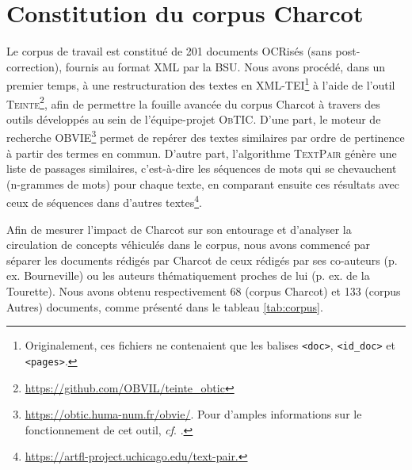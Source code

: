 \section{Constitution du corpus Charcot}
Le corpus de travail est constitué de 201 documents OCRisés (sans post-correction), fournis au format \textsc{XML} par la \textsc{BSU}. Nous avons procédé, dans un premier temps, à une restructuration des textes en \textsc{XML-TEI}\footnote{Originalement, ces fichiers ne contenaient que les balises \texttt{<doc>}, \texttt{<id\_doc>} et \texttt{<pages>}.} à l'aide de l'outil \textsc{Teinte}\footnote{\url{https://github.com/OBVIL/teinte\_obtic}}, afin de permettre la fouille avancée du corpus Charcot à travers des outils développés au sein de l'équipe-projet \textsc{ObTIC}. D'une part, le moteur de recherche \textsc{OBVIE}\footnote{\url{https://obtic.huma-num.fr/obvie/}. Pour d'amples informations sur le fonctionnement de cet outil, \textit{cf}. \citet{alrahabi2022obvie}.} permet de repérer des textes similaires par ordre de pertinence à partir des termes en commun. D'autre part, l'algorithme \textsc{TextPair} génère une liste de passages similaires, c'est-à-dire les séquences de mots qui se chevauchent (n-grammes de mots) pour chaque texte, en comparant ensuite ces résultats avec ceux de séquences dans d'autres textes\footnote{\url{https://artfl-project.uchicago.edu/text-pair.}}.

Afin de mesurer l'impact de Charcot sur son entourage et d'analyser la circulation de concepts véhiculés dans le corpus, nous avons commencé par séparer les documents rédigés par Charcot de ceux rédigés par ses co-auteurs (p. ex. Bourneville) ou les auteurs thématiquement proches de lui (p. ex. de la Tourette). Nous avons obtenu respectivement 68 (corpus \og{}Charcot\fg{}) et 133 (corpus \og{}Autres\fg{}) documents, comme présenté dans le tableau \ref{tab:corpus}. 

